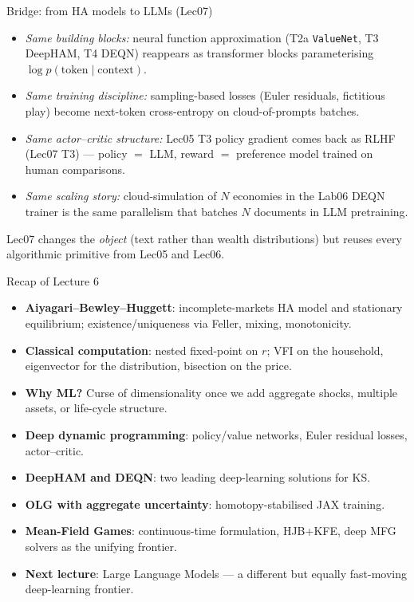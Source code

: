 \begin{frame}{Bridge: from HA models to LLMs (Lec07)}
\begin{itemize}
\item \textit{Same building blocks:} neural function approximation (T2a \texttt{ValueNet}, T3 DeepHAM, T4 DEQN) reappears as transformer blocks parameterising $\log p(\text{token} \mid \text{context})$.
\medskip
\item \textit{Same training discipline:} sampling-based losses (Euler residuals, fictitious play) become next-token cross-entropy on cloud-of-prompts batches.
\medskip
\item \textit{Same actor--critic structure:} Lec05 T3 policy gradient comes back as RLHF (Lec07 T3) --- policy $=$ LLM, reward $=$ preference model trained on human comparisons.
\medskip
\item \textit{Same scaling story:} cloud-simulation of $N$ economies in the Lab06 DEQN trainer is the same parallelism that batches $N$ documents in LLM pretraining.
\end{itemize}
\medskip
Lec07 changes the \emph{object} (text rather than wealth distributions) but reuses every algorithmic primitive from Lec05 and Lec06.
\end{frame}

\begin{frame}{Recap of Lecture 6}
\begin{itemize}
\item \textbf{Aiyagari--Bewley--Huggett}: incomplete-markets HA model and stationary equilibrium; existence/uniqueness via Feller, mixing, monotonicity.
\medskip
\item \textbf{Classical computation}: nested fixed-point on $r$; VFI on the household, eigenvector for the distribution, bisection on the price.
\medskip
\item \textbf{Why ML?} Curse of dimensionality once we add aggregate shocks, multiple assets, or life-cycle structure.
\medskip
\item \textbf{Deep dynamic programming}: policy/value networks, Euler residual losses, actor--critic.
\medskip
\item \textbf{DeepHAM and DEQN}: two leading deep-learning solutions for KS.
\medskip
\item \textbf{OLG with aggregate uncertainty}: homotopy-stabilised JAX training.
\medskip
\item \textbf{Mean-Field Games}: continuous-time formulation, HJB+KFE, deep MFG solvers as the unifying frontier.
\medskip
\item \textbf{Next lecture}: Large Language Models --- a different but equally fast-moving deep-learning frontier.
\end{itemize}
\end{frame}



